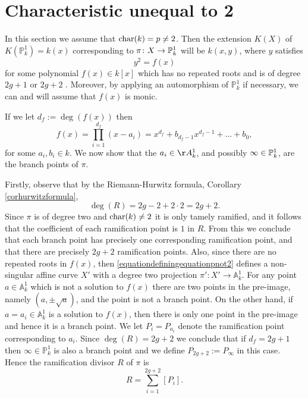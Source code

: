 \section{Characteristic unequal to 2}\label{charneq2}

In this section we assume that $\operatorname{char}(k) = p \neq 2$.
Then the extension $K(X)$ of $K(\mathbb P_k^1) = k(x)$ corresponding to $ \pi \colon X \rightarrow \mathbb P_k^1$ will be $k(x,y)$, where $y$ satisfies
    \begin{equation}\label{equationdefiningequationpnot2}
    y^2 = f(x)
    \end{equation}
for some polynomial $f(x) \in k[x]$ which has no repeated roots and is of degree $2g+1$ or $2g+2$ \cite[Prop.\ 7.4.24]{liu}.
Moreover, by applying an automorphism of $\mathbb P_k^1$ if necessary, we can and will assume that $f(x)$ is monic.

If we let $d_f:=\deg(f(x))$ then 
    \begin{equation}\label{equationexpansionoff(x)}
    f(x) = \prod_{i=1}^{d_f} (x-a_i) = x^{d_f} + b_{d_f - 1}x^{d_f-1} + \ldots + b_0,
    \end{equation}
for some $a_i, b_i \in k$.
We now show that the $a_i \in \AA_k^1$, and possibly $\infty \in {\mathbb P}_k^1$, are the branch points of $\pi$.

Firstly, observe that by the Riemann-Hurwitz formula, Corollary \ref{corhurwitzformula},
    \[ 
    \deg(R) = 2g -2 +2\cdot 2 = 2g + 2.
    \]
Since $\pi$ is of degree two and $\operatorname{char} (k) \neq 2$ it is only tamely ramified, and it follows that the coefficient of each ramification point is $1$ in $R$.
From this we conclude that each branch point has precisely one corresponding ramification point, and that there are precisely $2g+2$ ramification points.
Also, since there are no repeated roots in $f(x)$, then \eqref{equationdefiningequationpnot2} defines a non-singular affine curve $X'$ with a degree two projection $\pi'\colon X'\rightarrow \mathbb A_k^1$.
For any point $a\in \mathbb A_k^1$ which is not a solution to $f(x)$ there are two points in the pre-image, namely $(a,\pm \sqrt{a})$, and the point is not a branch point.
On the other hand, if $a = a_i \in \mathbb A_k^1$ is a solution to $f(x)$, then there is only one point in the pre-image and hence it is a branch point.
We let $P_i = P_{a_i}$ denote the ramification point corresponding to $a_i$.
Since $\deg(R) = 2g+2$ we conclude that if $d_f = 2g+1$ then $\infty \in \mathbb P_k^1$ is also a branch point and we define $P_{2g+2} := P_\infty$ in this case.
Hence the ramification divisor $R$ of $\pi$ is
    \[
    R = \sum_{i=1}^{2g+2} [P_i] .
    \]


